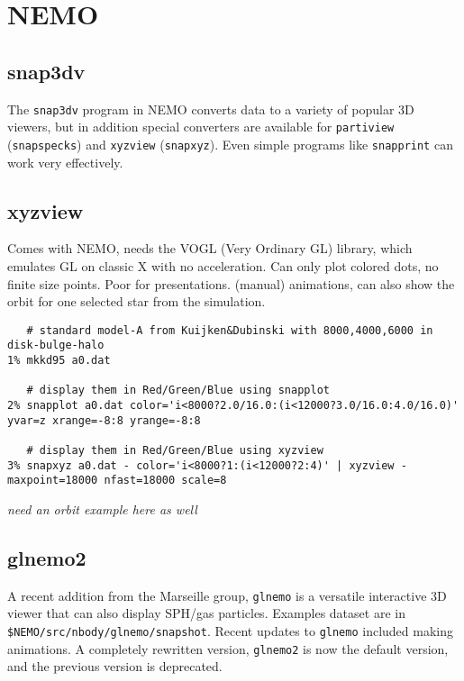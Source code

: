 {\section{NEMO}


\subsection{snap3dv}

The {\tt snap3dv} program in NEMO converts data to a variety of popular
3D viewers, but in addition special converters are available 
for {\tt partiview} ({\tt snapspecks}) and {\tt xyzview} ({\tt snapxyz}).
Even simple programs like {\tt snapprint} can work very effectively.

\subsection{xyzview}

Comes with NEMO, needs the VOGL (Very Ordinary GL) library, which emulates
GL on classic X with no acceleration. Can only plot colored dots, no finite
size points. Poor for presentations. (manual) animations, can also show
the orbit for one selected star from the simulation. 


\footnotesize\begin{verbatim}
   # standard model-A from Kuijken&Dubinski with 8000,4000,6000 in disk-bulge-halo
1% mkkd95 a0.dat

   # display them in Red/Green/Blue using snapplot 
2% snapplot a0.dat color='i<8000?2.0/16.0:(i<12000?3.0/16.0:4.0/16.0)' yvar=z xrange=-8:8 yrange=-8:8

   # display them in Red/Green/Blue using xyzview
3% snapxyz a0.dat - color='i<8000?1:(i<12000?2:4)' | xyzview - maxpoint=18000 nfast=18000 scale=8
\end{verbatim}\normalsize

{\it need an orbit example here as well}

\subsection{glnemo2}

A recent addition from the Marseille group, {\tt glnemo} is a versatile 
interactive 3D viewer that can also display SPH/gas particles. Examples
dataset are in {\tt \$NEMO/src/nbody/glnemo/snapshot}. 
Recent updates to  {\tt glnemo} included making animations. A completely
rewritten version, {\tt glnemo2} is now the default version, and the
previous version is deprecated.

}
